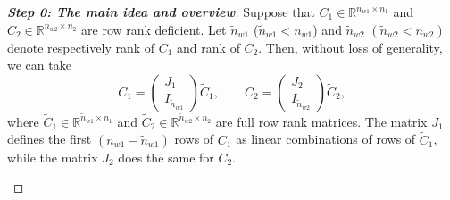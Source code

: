 \documentclass[11pt,a4paper,oneside,DIV=12,headings=small]{scrartcl}
\newcommand{\Rset}{\mathbb{R}}
\theoremstyle{plain}
\begin{document}
\medskip

\begin{proof}[\textbf{Step 0: \textit{The main idea and overview}}]
Suppose that $C_1 \in \Rset^{n_{w1}\times n_1}$ and $C_2 \in \Rset^{n_{w2}\times n_2}$ are row rank deficient. Let $\tilde{n}_{w1}$ ($\tilde{n}_{w1} < n_{w1}$) and $\tilde{n}_{w2}$ $(\tilde{n}_{w2} < n_{w2})$ denote respectively rank of $C_1$ and rank of $C_2$. Then, without loss of generality, we can take
\begin{equation}
\label{Cmatrices}
C_1=\begin{pmatrix} J_1 \\ I_{\tilde{n}_{w1}} \end{pmatrix} \tilde{C}_1, \quad \quad C_2=\begin{pmatrix} J_2 \\ I_{\tilde{n}_{w2}} \end{pmatrix} \tilde{C}_2,
\end{equation}  
where $\tilde{C}_1 \in \Rset^{\tilde{n}_{w1} \times n_1}$ and $\tilde{C}_2 \in \Rset^{\tilde{n}_{w2} \times n_2}$ are full row rank matrices. The matrix $J_1 $ defines the first $(n_{w1}-\tilde{n}_{w1})$ rows of $C_1$ as linear combinations of rows of $\tilde{C}_1$, while the matrix $J_2$ does the same for $C_2$.   

\begin{figure}[h!]
\centering
\end{figure}
\end{proof}
\end{document}

